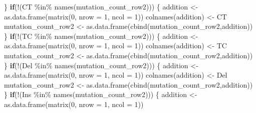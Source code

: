 \documentclass[
]{article}
\newenvironment{Shaded}{\begin{snugshade}}{\end{snugshade}}
\newcommand{\AttributeTok}[1]{\textcolor[rgb]{0.77,0.63,0.00}{#1}}
\newcommand{\ControlFlowTok}[1]{\textcolor[rgb]{0.13,0.29,0.53}{\textbf{#1}}}
\newcommand{\DecValTok}[1]{\textcolor[rgb]{0.00,0.00,0.81}{#1}}
\newcommand{\FunctionTok}[1]{\textcolor[rgb]{0.00,0.00,0.00}{#1}}
\newcommand{\NormalTok}[1]{#1}
\newcommand{\OtherTok}[1]{\textcolor[rgb]{0.56,0.35,0.01}{#1}}
\newcommand{\SpecialCharTok}[1]{\textcolor[rgb]{0.00,0.00,0.00}{#1}}
\newcommand{\StringTok}[1]{\textcolor[rgb]{0.31,0.60,0.02}{#1}}
\begin{document}
\begin{Shaded}
\begin{Highlighting}[]
\NormalTok{  \}}
  \ControlFlowTok{if}\NormalTok{(}\SpecialCharTok{!}\NormalTok{(}\StringTok{\textquotesingle{}CT\textquotesingle{}} \SpecialCharTok{\%in\%} \FunctionTok{names}\NormalTok{(mutation\_count\_row2)))}
\NormalTok{  \{}
\NormalTok{    addition }\OtherTok{\textless{}{-}} \FunctionTok{as.data.frame}\NormalTok{(}\FunctionTok{matrix}\NormalTok{(}\DecValTok{0}\NormalTok{, }\AttributeTok{nrow =} \DecValTok{1}\NormalTok{, }\AttributeTok{ncol =} \DecValTok{1}\NormalTok{))}
    \FunctionTok{colnames}\NormalTok{(addition) }\OtherTok{\textless{}{-}} \StringTok{\textquotesingle{}CT\textquotesingle{}}
\NormalTok{    mutation\_count\_row2 }\OtherTok{\textless{}{-}} \FunctionTok{as.data.frame}\NormalTok{(}\FunctionTok{cbind}\NormalTok{(mutation\_count\_row2,addition))}
\NormalTok{  \}}
  \ControlFlowTok{if}\NormalTok{(}\SpecialCharTok{!}\NormalTok{(}\StringTok{\textquotesingle{}TC\textquotesingle{}} \SpecialCharTok{\%in\%} \FunctionTok{names}\NormalTok{(mutation\_count\_row2)))}
\NormalTok{  \{}
\NormalTok{    addition }\OtherTok{\textless{}{-}} \FunctionTok{as.data.frame}\NormalTok{(}\FunctionTok{matrix}\NormalTok{(}\DecValTok{0}\NormalTok{, }\AttributeTok{nrow =} \DecValTok{1}\NormalTok{, }\AttributeTok{ncol =} \DecValTok{1}\NormalTok{))}
    \FunctionTok{colnames}\NormalTok{(addition) }\OtherTok{\textless{}{-}} \StringTok{\textquotesingle{}TC\textquotesingle{}}
\NormalTok{    mutation\_count\_row2 }\OtherTok{\textless{}{-}} \FunctionTok{as.data.frame}\NormalTok{(}\FunctionTok{cbind}\NormalTok{(mutation\_count\_row2,addition))}
\NormalTok{  \}}
  \ControlFlowTok{if}\NormalTok{(}\SpecialCharTok{!}\NormalTok{(}\StringTok{\textquotesingle{}Del\textquotesingle{}} \SpecialCharTok{\%in\%} \FunctionTok{names}\NormalTok{(mutation\_count\_row2)))}
\NormalTok{  \{}
\NormalTok{    addition }\OtherTok{\textless{}{-}} \FunctionTok{as.data.frame}\NormalTok{(}\FunctionTok{matrix}\NormalTok{(}\DecValTok{0}\NormalTok{, }\AttributeTok{nrow =} \DecValTok{1}\NormalTok{, }\AttributeTok{ncol =} \DecValTok{1}\NormalTok{))}
    \FunctionTok{colnames}\NormalTok{(addition) }\OtherTok{\textless{}{-}} \StringTok{\textquotesingle{}Del\textquotesingle{}}
\NormalTok{    mutation\_count\_row2 }\OtherTok{\textless{}{-}} \FunctionTok{as.data.frame}\NormalTok{(}\FunctionTok{cbind}\NormalTok{(mutation\_count\_row2,addition))}
\NormalTok{  \}}
  \ControlFlowTok{if}\NormalTok{(}\SpecialCharTok{!}\NormalTok{(}\StringTok{\textquotesingle{}Ins\textquotesingle{}} \SpecialCharTok{\%in\%} \FunctionTok{names}\NormalTok{(mutation\_count\_row2)))}
\NormalTok{  \{}
\NormalTok{    addition }\OtherTok{\textless{}{-}} \FunctionTok{as.data.frame}\NormalTok{(}\FunctionTok{matrix}\NormalTok{(}\DecValTok{0}\NormalTok{, }\AttributeTok{nrow =} \DecValTok{1}\NormalTok{, }\AttributeTok{ncol =} \DecValTok{1}\NormalTok{))}

\end{Highlighting}
\end{Shaded}
\end{document}
